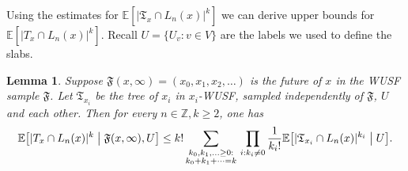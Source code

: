 \documentclass[12pt]{article}
\newtheorem{lemma}[theorem]{Lemma}
\numberwithin{equation}{section}
\newcommand{\be}{\begin{equation}}
\newcommand{\ee}{\end{equation}}
\newcommand{\1}{\mathbf{1}}
\begin{document}
 Using the estimates for $\mathbb{E}[|\mathfrak{T}_x\cap L_n(x)|^k]$ we can derive upper bounds for $\mathbb{E}[|T_x\cap L_n(x)|^k]$. Recall $U=\{U_v:v\in V\}$ are the labels we used to define the slabs. 
 
 \begin{lemma}\label{lem: bounds high moments of T_x intersections in terms of the x-WUSF ones}
 	Suppose $\mathfrak{F}(x,\infty)=(x_0,x_1,x_2,\ldots)$ is the future of $x$ in the WUSF sample $\mathfrak{F}$. Let $\mathfrak{T}_{x_i}$ be the tree of $x_i$ in  $x_i$-WUSF, sampled independently of  $\mathfrak{F}$, $U$ and each other. Then for every $n\in\mathbb{Z},k\geq 2$, one has
 	\be\label{eq: k-moments bounds between T_x and x-WUSF}
 	\mathbb{E}\big[|T_x\cap L_n(x)|^k\bigm|\mathfrak{F}(x,\infty),U\big]
 	\leq k! \sum_{\substack{k_0,k_1,\ldots \geq 0:\\ k_0+ k_1+\cdots  =k}} \, \prod_{i:k_i\neq 0} \frac{1}{k_i!}\mathbb{E}\big[|\mathfrak{T}_{x_i}\cap L_n(x)|^{k_i}\bigm|U\big]. 
 	\ee
 \end{lemma}
\end{document}
